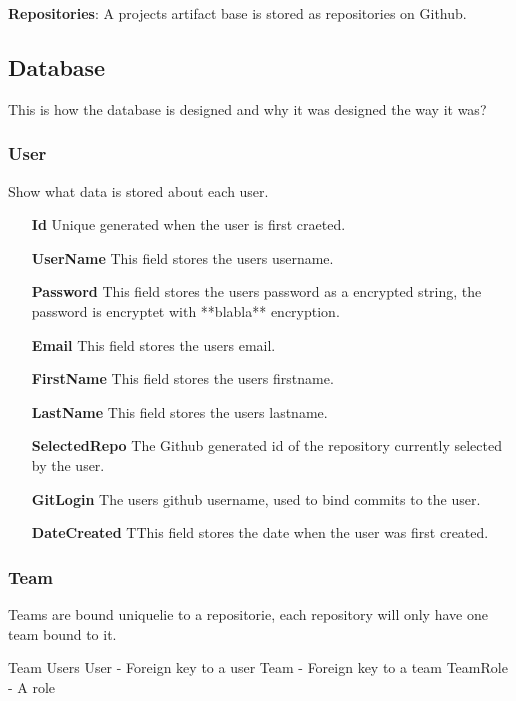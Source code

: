 \textbf{Repositories}:
A projects artifact base is stored as repositories on Github.

\subsection{Database}

This is how the database is designed and why it was designed the way it was?

\subsubsection*{User}
Show what data is stored about each user.
\vspace{0.5cm}
\begin{itemize}
    \item[\textbf{Id}]{Unique generated when the user is first craeted.}
    \item[\textbf{UserName}]{This field stores the users username.}
    \item[\textbf{Password}]{This field stores the users password as a encrypted string, the password is encryptet with **blabla** encryption.}
    \item[\textbf{Email}]{This field stores the users email.}
    \item[\textbf{FirstName}]{This field stores the users firstname.}
    \item[\textbf{LastName}]{This field stores the users lastname.}
    \item[\textbf{SelectedRepo}]{The Github generated id of the repository currently selected by the user.}
    \item[\textbf{GitLogin}]{The users github username, used to bind commits to the user.}
    \item[\textbf{DateCreated}]{TThis field stores the date when the user was first created.}
\end{itemize}
\vspace{0.5cm}

\subsubsection{Team}
Teams are bound uniquelie to a repositorie, each repository will only have one team bound to it. %

Team Users
User - Foreign key to a user
Team - Foreign key to a team
TeamRole - A role 

